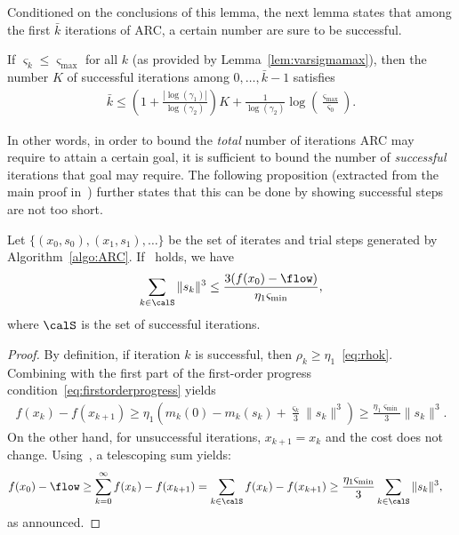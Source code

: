 Conditioned on the conclusions of this lemma, the next lemma states that among the first $\bar k$ iterations of ARC, a certain number are sure to be successful.
\begin{lemma} \label{lem:boundKsuccessfulsteps}
	If $\varsigma_k \leq \varsigma_{\max}$ for all $k$ (as provided by Lemma~\ref{lem:varsigmamax}), then the number $K$ of successful iterations among $0, \ldots, \bar k-1$ satisfies
	\begin{align*}
		\bar k \leq \left(1 + \frac{|\log(\gamma_1)|}{\log(\gamma_2)}\right) K + \frac{1}{\log(\gamma_2)} \log\left(\frac{\varsigma_{\max}}{\varsigma_0}\right).
	\end{align*}
\end{lemma}
In other words, in order to bound the \emph{total} number of iterations ARC may require to attain a certain goal, it is sufficient to bound the number of \emph{successful} iterations that goal may require. The following proposition (extracted from the main proof in~\citep{bcgmt}) further states that this can be done by showing successful steps are not too short.
\begin{proposition} \label{prop:sumnormskcube}
	Let $\{ (x_0, s_0), (x_1, s_1), \ldots \}$ be the set of iterates and trial steps generated by Algorithm~\ref{algo:ARC}. If~ holds, we have
	\begin{align*}
	\sum_{k\in\calS} \|s_k\|^3 \leq \frac{3(f(x_0) - \flow)}{\eta_1 \varsigma_{\min}},
	\end{align*}
	where $\calS$ is the set of successful iterations.
\end{proposition}
\begin{proof}
	By definition, if iteration $k$ is successful, then $\rho_k \geq \eta_1$~\eqref{eq:rhok}. Combining with the first part of the first-order progress condition~\eqref{eq:firstorderprogress} yields
	\begin{align*}
	f(x_k) - f(x_{k+1}) \geq \eta_1\!\left(m_k(0) - m_k(s_k) + \frac{\varsigma_k}{3} \|s_k\|^3 \right)  \geq \frac{\eta_1\varsigma_{\min}}{3} \|s_k\|^3. %
	\end{align*}
	On the other hand, for unsuccessful iterations, $x_{k+1} = x_k$ and the cost does not change.
	Using~, a telescoping sum yields:
	\begin{align*}
	f(x_0) - \flow & \geq \sum_{k=0}^\infty f(x_k) - f(x_{k+1}) = \sum_{k\in\calS} f(x_k) - f(x_{k+1}) \geq \frac{\eta_1 \varsigma_{\min}}{3} \sum_{k\in\calS} \|s_k\|^3,
	\end{align*}
	as announced.
\end{proof}



